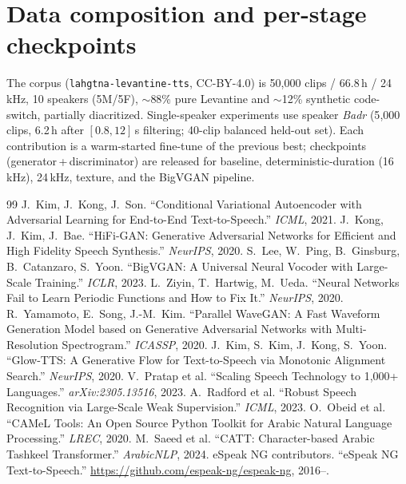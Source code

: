 \documentclass[10pt,twocolumn]{article}
\begin{document}
\section{Data composition and per-stage checkpoints}
\label{app:data}
The corpus (\texttt{lahgtna-levantine-tts}, CC-BY-4.0) is 50{,}000 clips / 66.8\,h / 24\,kHz,
10 speakers (5M/5F), \(\sim\)88\% pure Levantine and \(\sim\)12\% synthetic code-switch,
partially diacritized. Single-speaker experiments use speaker \emph{Badr} (5{,}000 clips,
6.2\,h after \([0.8,12]\)\,s filtering; 40-clip balanced held-out set). Each contribution is a
warm-started fine-tune of the previous best; checkpoints (generator\,+\,discriminator) are
released for baseline, deterministic-duration (16\,kHz), 24\,kHz, texture, and the BigVGAN
pipeline.

\twocolumn
{\small
\begin{thebibliography}{99}
 J.~Kim, J.~Kong, J.~Son. ``Conditional Variational Autoencoder with
Adversarial Learning for End-to-End Text-to-Speech.'' \emph{ICML}, 2021.
 J.~Kong, J.~Kim, J.~Bae. ``HiFi-GAN: Generative Adversarial Networks for
Efficient and High Fidelity Speech Synthesis.'' \emph{NeurIPS}, 2020.
 S.~Lee, W.~Ping, B.~Ginsburg, B.~Catanzaro, S.~Yoon. ``BigVGAN: A Universal
Neural Vocoder with Large-Scale Training.'' \emph{ICLR}, 2023.
 L.~Ziyin, T.~Hartwig, M.~Ueda. ``Neural Networks Fail to Learn Periodic
Functions and How to Fix It.'' \emph{NeurIPS}, 2020.
 R.~Yamamoto, E.~Song, J.-M.~Kim. ``Parallel WaveGAN: A Fast Waveform Generation
Model based on Generative Adversarial Networks with Multi-Resolution Spectrogram.''
\emph{ICASSP}, 2020.
 J.~Kim, S.~Kim, J.~Kong, S.~Yoon. ``Glow-TTS: A Generative Flow for
Text-to-Speech via Monotonic Alignment Search.'' \emph{NeurIPS}, 2020.
 V.~Pratap et al. ``Scaling Speech Technology to 1,000+ Languages.''
\emph{arXiv:2305.13516}, 2023.
 A.~Radford et al. ``Robust Speech Recognition via Large-Scale Weak
Supervision.'' \emph{ICML}, 2023.
 O.~Obeid et al. ``CAMeL Tools: An Open Source Python Toolkit for Arabic
Natural Language Processing.'' \emph{LREC}, 2020.
 M.~Saeed et al. ``CATT: Character-based Arabic Tashkeel Transformer.''
\emph{ArabicNLP}, 2024.
 eSpeak NG contributors. ``eSpeak NG Text-to-Speech.''
\url{https://github.com/espeak-ng/espeak-ng}, 2016--.
\end{thebibliography}
}
\end{document}
